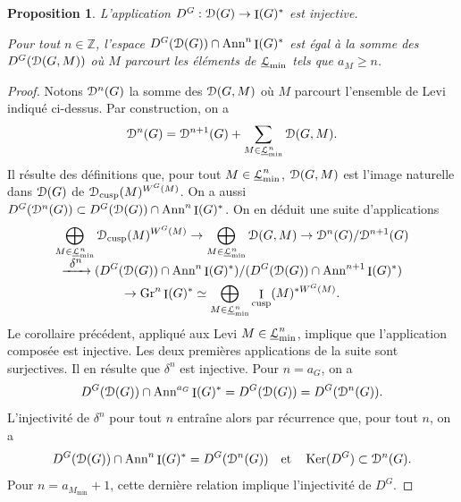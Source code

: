 \documentclass[11pt]{article}
\newcommand{\skpt}{\smallskip}
\numberwithin{equation}{section}\providecommand{\og}{«\,}\providecommand{\fg}{\,»}
\let\mathcal \EuScript
\let\oldenumerate\enumerate
\renewcommand{\enumerate}{\oldenumerate\itemindent0pt}
\newenvironment{enumeratei}
{\bgroup\def\theenumi{\roman{enumi}}\def\theenumii{\arabic{enumii}}\oldenumerate}
{\endenumerate\egroup}
\newcommand{\quadet}{\quad\text{et}\quad}
\def\To#1{\mathchoice{\xrightarrow{\textstyle\kern4pt#1\kern3pt}}{\stackrel{#1}{\longrightarrow}}{}{}}
\newcommand{\Ann}{\mathrm{Ann}}
\newcommand{\cusp}{\mathrm{cusp}}
\newcommand{\Gr}{\mathrm{Gr}}
\DeclareMathOperator{\rI}{I}
\DeclareMathOperator{\Ker}{Ker}
\newcommand{\cD}{\mathcal{D}}
\newcommand{\cL}{\mathcal{L}}
\newcommand{\ZZ}{\mathbb{Z}}
\theoremstyle{plain}
\newtheorem*{prop*}{Proposition}
\theoremstyle{definition}
\begin{document}
\skpt
\begin{prop*}
\begin{enumeratei}
\item\label{injectivitei}
L'application $D^G:\cD(G)\to \rI(G)^*$ est injective.

\item\label{injectiviteii}
Pour tout $n\in \ZZ$, l'espace $D^G(\cD(G))\cap \Ann^n\rI(G)^*$ est égal à la somme des $D^G(\cD(G,M))$ où $M$ parcourt les éléments de $\underline{\cL}_{\min}$ tels que $a_{M}\geq n$.
\end{enumeratei}
\end{prop*}

\begin{proof}
Notons $\cD^n(G)$ la somme des $\cD(G,M)$ où $M$ parcourt l'ensemble de Levi indiqué ci-dessus. Par construction, on a
\[
\cD^n(G)=\cD^{n+1}(G)+\sum_{M\in \underline{\cL}^n_{\min}}\cD(G,M).
\]
Il résulte des définitions que, pour tout $M\in \underline{\cL}^n_{\min}$, $\cD(G,M)$ est l'image naturelle dans $\cD(G)$ de $\cD_{\cusp}(M)^{W^G(M)}$.
On a aussi $D^G(\cD^n(G))\subset D^G(\cD(G))\cap \Ann^n\rI(G)^*$. On en déduit une suite d'applications
\begin{multline*}
\bigoplus_{M\in \underline{\cL}^n_{\min}} \cD_{\cusp}(M)^{W^G(M)}\to \bigoplus_{M\in \underline{\cL}^n_{\min}}\cD(G,M)\to \cD^n(G)/\cD^{n+1}(G)\\[-5pt]
\To{\delta^n} (D^G(\cD(G))\cap \Ann^n\rI(G)^*)/(D^G(\cD(G))\cap \Ann^{n+1}\rI(G)^*)\\
\to \Gr^n\rI(G)^*\simeq \bigoplus_{M\in \underline{\cL}^n_{\min}}\rI_{\cusp}(M)^{*W^G(M)}.
\end{multline*}
Le corollaire précédent, appliqué aux Levi $M\in\underline{\cL}_{\min}^n$, implique que l'application composée est injective. Les deux premières applications de la suite sont surjectives. Il en résulte que $\delta^{n}$ est injective. Pour $n=a_{G}$, on a
\[
D^G(\cD(G))\cap \Ann^{a_{G}}\rI(G)^*=D^G(\cD(G))=D^G(\cD^n(G)).
\]
L'injectivité de $\delta^{n}$ pour tout $n$ entraîne alors par récurrence que, pour tout $n$, on a
\[
D^G(\cD(G))\cap \Ann^n\rI(G)^*=D^G(\cD^n(G))\quadet \Ker(D^G)\subset \cD^n(G).
\]
Pour $n=a_{M_{\min}}+1$, cette dernière relation implique l'injectivité de $D^G$.
\end{proof}
\end{document}
